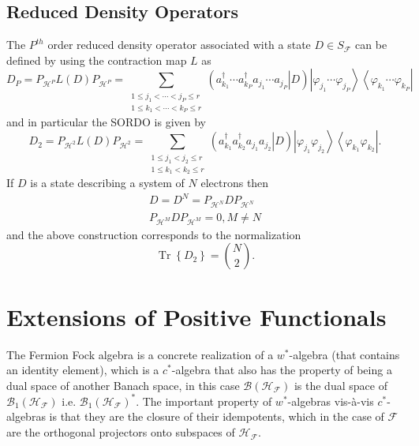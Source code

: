 \documentclass[aps,preprint,amsfonts,amssymb,showpacs,showkeys]{revtex4}%
\begin{document}
\subsection{Reduced Density Operators \label{Reduced Density Operators}}

The $P^{th}$ order reduced density operator associated with a state $D\in
S_{\mathcal{F}}$ can be defined by using the contraction map $L$ as
\begin{equation}
D_{P}=P_{\mathcal{H}^{P}}L\left(  D\right)  P_{\mathcal{H}^{P}}=\sum
_{\substack{1\leq j_{1}<\cdots<j_{P}\leq r\\1\leq k_{1}<\cdots<k_{P}\leq
r}}\left(  \left.  a_{k_{1}}^{\dagger}\cdots a_{k_{P}}^{\dagger}a_{j_{1}%
}\cdots a_{j_{P}}\right\vert D\right)  \left\vert \varphi_{j_{1}}\cdots
\varphi_{j_{P}}\right\rangle \left\langle \varphi_{k_{1}}\cdots\varphi_{k_{P}%
}\right\vert \label{PORDO}%
\end{equation}
and in particular the SORDO is given by
\begin{equation}
D_{2}=P_{\mathcal{H}^{2}}L\left(  D\right)  P_{\mathcal{H}^{2}}=\sum
_{\substack{1\leq j_{1}<j_{2}\leq r\\1\leq k_{1}<k_{2}\leq r}}\left(  \left.
a_{k_{1}}^{\dagger}a_{k_{2}}^{\dagger}a_{j_{1}}a_{j_{2}}\right\vert D\right)
\left\vert \varphi_{j_{1}}\varphi_{j_{2}}\right\rangle \left\langle
\varphi_{k_{1}}\varphi_{k_{2}}\right\vert .
\end{equation}
If $D$ is a state describing a system of $N$ electrons then
\begin{gather}
D=D^{N}=P_{\mathcal{H}^{N}}DP_{\mathcal{H}^{N}}\nonumber\\
P_{\mathcal{H}^{M}}DP_{\mathcal{H}^{M}}=0,M\neq N
\end{gather}
and the above construction corresponds to the normalization
\begin{equation}
\operatorname*{Tr}\left\{  D_{2}\right\}  =\binom{N}{2}.
\end{equation}


\section{Extensions of Positive Functionals \label{Extensions}}

The Fermion Fock algebra is a concrete realization of a $w^{\ast}$-algebra
\cite{Encyclo} (that contains an identity element), which is a $c^{\ast}%
$-algebra that also has the property of being a dual space of another Banach
space, in this case $\mathcal{B}\left(  \mathcal{H}_{\mathcal{F}}\right)  $ is
the dual space of $\mathcal{B}_{1}\left(  \mathcal{H}_{\mathcal{F}}\right)  $
i.e. $\mathcal{B}_{1}\left(  \mathcal{H}_{\mathcal{F}}\right)  ^{\ast}$. The
important property of $w^{\ast}$-algebras vis-\`{a}-vis $c^{\ast}$-algebras is
that they are the closure of their idempotents, which in the case of
$\mathcal{F}$ are the orthogonal projectors onto subspaces of $\mathcal{H}%
_{\mathcal{F}}.$
\end{document}
